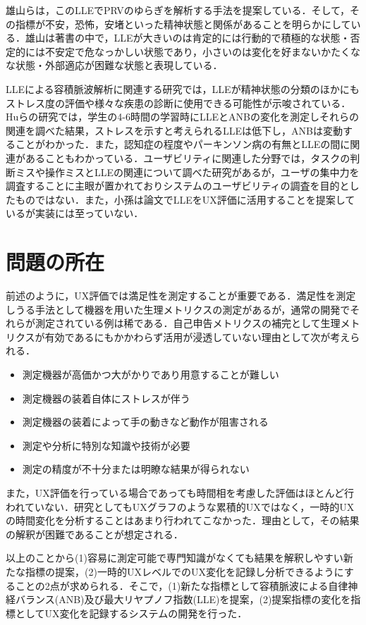 雄山らは，このLLEでPRVのゆらぎを解析する手法を提案している\cite{oyama2006}．そして，その指標が不安，恐怖，安堵といった精神状態と関係があることを明らかにしている\cite{imanishi2007}．雄山は著書の中で，LLEが大きいのは肯定的には行動的で積極的な状態・否定的には不安定で危なっかしい状態であり，小さいのは変化を好まないかたくなな状態・外部適応が困難な状態と表現している\cite{oyama2012book}．

LLEによる容積脈波解析に関連する研究では，LLEが精神状態の分類のほかにもストレス度の評価や様々な疾患の診断に使用できる可能性が示唆されている．Huらの研究では，学生の4-6時間の学習時にLLEとANBの変化を測定しそれらの関連を調べた結果，ストレスを示すと考えられるLLEは低下し，ANBは変動することがわかった\cite{hu}．また，認知症の程度やパーキンソン病の有無とLLEの間に関連があることもわかっている\cite{oyama2006dimentia}\cite{oyama2018perkinson}．ユーザビリティに関連した分野では，タスクの判断ミスや操作ミスとLLEの関連について調べた研究\cite{imanishi2006}があるが，ユーザの集中力を調査することに主眼が置かれておりシステムのユーザビリティの調査を目的としたものではない．また，小孫は論文でLLEをUX評価に活用することを提案しているが実装には至っていない\cite{komago}．

\section{問題の所在}

前述のように，UX評価では満足性を測定することが重要である．満足性を測定しうる手法として機器を用いた生理メトリクスの測定があるが，通常の開発でそれらが測定されている例は稀である．自己申告メトリクスの補完として生理メトリクスが有効であるにもかかわらず活用が浸透していない理由として次が考えられる．

\begin{itemize}
  \item 測定機器が高価かつ大がかりであり用意することが難しい
  \item 測定機器の装着自体にストレスが伴う
  \item 測定機器の装着によって手の動きなど動作が阻害される
  \item 測定や分析に特別な知識や技術が必要
  \item 測定の精度が不十分または明瞭な結果が得られない
\end{itemize}

また，UX評価を行っている場合であっても時間相を考慮した評価はほとんど行われていない．研究としてもUXグラフ\cite{kurosu2015}のような累積的UXではなく，一時的UXの時間変化を分析することはあまり行われてこなかった．理由として，その結果の解釈が困難であることが想定される．

以上のことから(1)容易に測定可能で専門知識がなくても結果を解釈しやすい新たな指標の提案，(2)一時的UXレベルでのUX変化を記録し分析できるようにすることの2点が求められる．そこで，(1)新たな指標として容積脈波による自律神経バランス(ANB)及び最大リヤプノフ指数(LLE)を提案，(2)提案指標の変化を指標としてUX変化を記録するシステムの開発を行った．